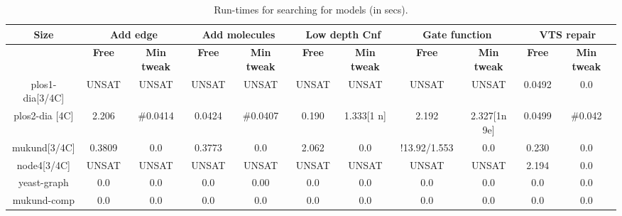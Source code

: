 
\begin{table}[t]
  \centering
  \begin{tabular}[t]{|c|c|c|c|c|c|c|c|c|c|c}\hline
    {\multirow{2}{*} \textbf{Size}}  & \multicolumn{2}{c|}{\textbf{Add edge}} & \multicolumn{2}{c|}{\textbf{Add molecules}} & \multicolumn{2}{c|}{\textbf{Low depth Cnf}}  &  \multicolumn{2}{c|}{\textbf{Gate function}} &  \multicolumn{2}{c|}{\textbf{VTS repair}} \\\hline
   
   \cline{2-9}
    {} & {\textbf{Free}} & {\textbf{Min tweak}} & {\textbf{Free}} & {\textbf{Min tweak}} & {\textbf{Free}} & {\textbf{Min tweak}} & {\textbf{Free}} & {\textbf{Min tweak}} & {\textbf{Free}} & {\textbf{Min tweak}} \\\hline
    
    plos1-dia[3/4C] & UNSAT & UNSAT & UNSAT & UNSAT & UNSAT & UNSAT & UNSAT & UNSAT & 0.0492 & 0.0\\\hline
    plos2-dia [4C] & 2.206 & \#0.0414 & 0.0424 & \#0.0407 & 0.190 & 1.333[1 n] & 2.192 & 2.327[1n 9e] & 0.0499 & \#0.042 \\\hline
    mukund[3/4C] & 0.3809 & 0.0 & 0.3773 & 0.0 & 2.062 & 0.0 & !13.92/1.553 & 0.0 & 0.230 & 0.0 \\\hline
    node4[3/4C] & UNSAT & UNSAT & UNSAT & UNSAT & UNSAT & UNSAT & UNSAT & UNSAT & 2.194 & 0.0\\\hline
    yeast-graph & 0.0 & 0.0 & 0.0 & 0.00 & 0.0 & 0.0 & 0.0  & 0.0 & 0.0 & 0.0 \\\hline
    mukund-comp & 0.0 & 0.0 & 0.0 & 0.0 & 0.0 & 0.0 & 0.0 & 0.0 & 0.0 & 0.0\\\hline
  \end{tabular}
  \caption{Run-times for searching for models (in secs).}
  \label{tab:qf-grabh}
\end{table}

